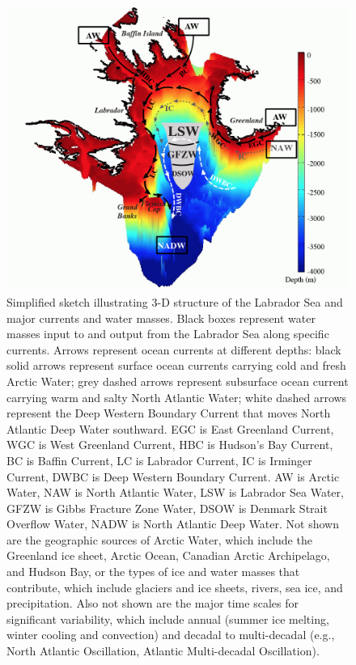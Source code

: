 \clearpage
\begin{figure}
\centering
\includegraphics[width=120mm]{figs_app/FigS1.png}
\caption[Simplified sketch illustrating 3-D structure of the Labrador Sea and major currents and water masses.]{Simplified sketch illustrating 3-D structure of the Labrador Sea and major currents and water masses. Black boxes represent water masses input to and output from the Labrador Sea along specific currents.  Arrows represent ocean currents at different depths: black solid arrows represent surface ocean currents carrying cold and fresh Arctic Water; grey dashed arrows represent subsurface ocean current carrying warm and salty North Atlantic Water; white dashed arrows represent the Deep Western Boundary Current that moves North Atlantic Deep Water southward.  EGC is East Greenland Current, WGC is West Greenland Current, HBC is Hudson's Bay Current, BC is Baffin Current, LC is Labrador Current, IC is Irminger Current, DWBC is Deep Western Boundary Current. AW is Arctic Water, NAW is North Atlantic Water, LSW is Labrador Sea Water, GFZW is Gibbs Fracture Zone Water, DSOW is Denmark Strait Overflow Water, NADW is North Atlantic Deep Water.  Not shown are the geographic sources of Arctic Water, which include the Greenland ice sheet, Arctic Ocean, Canadian Arctic Archipelago, and Hudson Bay, or the types of ice and water masses that contribute, which include glaciers and ice sheets, rivers, sea ice, and precipitation.  Also not shown are the major time scales for significant variability, which include annual (summer ice melting, winter cooling and convection) and decadal to multi-decadal (e.g., North Atlantic Oscillation, Atlantic Multi-decadal Oscillation).}
\label{fig:SI4_fig1}
\end{figure}

